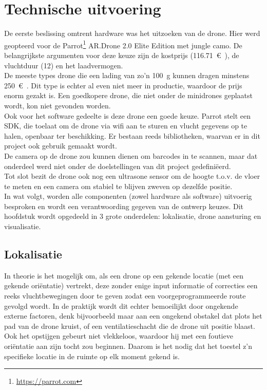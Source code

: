 \chapter{Technische uitvoering}
De eerste beslissing omtrent hardware was het uitzoeken van de drone.
Hier werd geopteerd voor de Parrot\footnote{\url{https://parrot.com}} AR.Drone 2.0 Elite Edition met jungle camo.
De belangrijkste argumenten voor deze keuze zijn de kostprijs (\SI{116.71}{\euro{}}), de vluchtduur (\SI{12}{\min}) en het laadvermogen.\\
De meeste types drone die een lading van zo'n \SI{100}{\g} kunnen dragen minstens \SI{250}{\euro{}}.
Dit type is echter al even niet meer in productie, waardoor de prijs enorm gezakt is.
Een goedkopere drone, die niet onder de minidrones geplaatst wordt, kon niet gevonden worden.\\
Ook voor het software gedeelte is deze drone een goede keuze. Parrot stelt een SDK, die toelaat om de drone via wifi aan te sturen en vlucht gegevens op te halen, openbaar ter beschikking.
Er bestaan reeds bibliotheken, waarvan er in dit project ook gebruik gemaakt wordt.\\
De camera op de drone zou kunnen dienen om barcodes in te scannen, maar dat onderdeel werd niet onder de doelstellingen van dit project gedefini\"eerd.\\
Tot slot bezit de drone ook nog een ultrasone sensor om de hoogte t.o.v. de vloer te meten en een camera om stabiel te blijven zweven op dezelfde positie.\\

In wat volgt, worden alle componenten (zowel hardware als software) uitvoerig besproken en wordt een verantwoording gegeven van de ontwerp keuzes. Dit hoofdstuk wordt opgedeeld in 3 grote onderdelen: lokalisatie, drone aansturing en visualisatie.

\section{Lokalisatie}
In theorie is het mogelijk om, als een drone op een gekende locatie (met een gekende ori\"entatie) vertrekt, deze zonder enige input informatie of correcties een reeks vluchtbewegingen door te geven zodat een voorgeprogrammeerde route gevolgd wordt. In de praktijk wordt dit echter bemoeilijkt door ongekende externe factoren, denk bijvoorbeeld maar aan een ongekend obstakel dat plots het pad van de drone kruist, of een ventilatieschacht die de drone uit positie blaast. Ook het opstijgen gebeurt niet vlekkeloos, waardoor hij met een foutieve ori\"entatie aan zijn tocht zou beginnen. Daarom is het nodig dat het toestel z'n specifieke locatie in de ruimte op elk moment gekend is.\\

